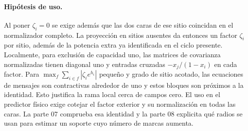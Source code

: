 \paragraph{Hipótesis de uso.}
Al poner $\zeta_i=0$ se exige además que las dos caras de ese sitio coincidan
en el normalizador completo. La proyección en sitios ausentes da entonces un factor
$\zeta_i$ por sitio, además de la potencia extra ya identificada en el ciclo presente.
Localmente, para exclusión de capacidad uno, las matrices de covarianza normalizadas
tienen diagonal uno y entradas cruzadas $-x_j/(1-x_i)$ en cada factor.
Para $\max_f\sum_{i\in f}|\zeta_i e^{h_i}|$ pequeño y grado de sitio acotado,
las ecuaciones de mensajes son contractivas alrededor de uno y estos bloques
son próximos a la identidad. Esto justifica la rama local cerca de campos cero.
El uso en el predictor físico exige cotejar el factor exterior y su normalización
en todas las caras. La parte 07 comprueba esa identidad y la parte 08 explicita
qué radios se usan para estimar un soporte cuyo número de marcas aumenta.
